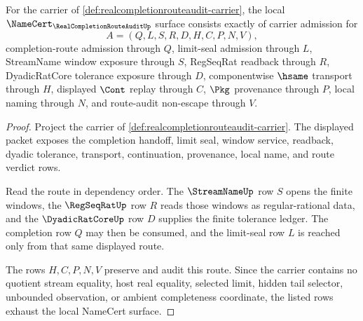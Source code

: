 \begin{theorem}
\label{thm:realcompletionrouteaudit-namecert-obligations}
For the carrier of \autoref{def:realcompletionrouteaudit-carrier}, the local $\NameCert_{\RealCompletionRouteAuditUp}$ surface consists exactly of carrier admission for
$$
A=(Q,L,S,R,D,H,C,P,N,V),
$$
completion-route admission through $Q$, limit-seal admission through $L$, StreamName window exposure through $S$, RegSeqRat readback through $R$, DyadicRatCore tolerance exposure through $D$, componentwise $\hsame$ transport through $H$, displayed $\Cont$ replay through $C$, $\Pkg$ provenance through $P$, local naming through $N$, and route-audit non-escape through $V$.
\end{theorem}
\begin{proof}
Project the carrier of \autoref{def:realcompletionrouteaudit-carrier}. The displayed packet exposes the completion handoff, limit seal, window service, readback, dyadic tolerance, transport, continuation, provenance, local name, and route verdict rows.

Read the route in dependency order. The $\StreamNameUp$ row $S$ opens the finite windows, the $\RegSeqRatUp$ row $R$ reads those windows as regular-rational data, and the $\DyadicRatCoreUp$ row $D$ supplies the finite tolerance ledger. The completion row $Q$ may then be consumed, and the limit-seal row $L$ is reached only from that same displayed route.

The rows $H,C,P,N,V$ preserve and audit this route. Since the carrier contains no quotient stream equality, host real equality, selected limit, hidden tail selector, unbounded observation, or ambient completeness coordinate, the listed rows exhaust the local NameCert surface.
\end{proof}

